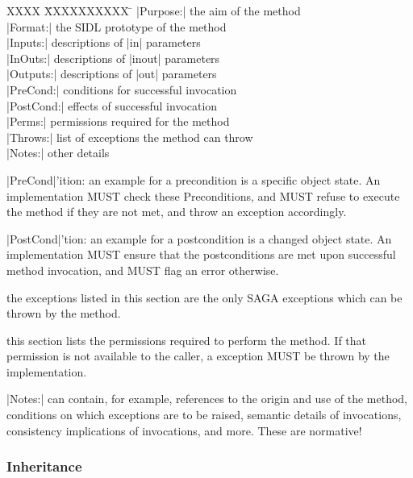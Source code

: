     \begin{tabbing}
     XXXX \= XXXXXXXXXX    \= \kill
          \> |Purpose:|    \> the aim of the method\\
          \> |Format:|     \> the SIDL prototype of the method\\
          \> |Inputs:|     \> descriptions of |in|    parameters\\
          \> |InOuts:|     \> descriptions of |inout| parameters\\
          \> |Outputs:|    \> descriptions of |out|   parameters\\
          \> |PreCond:|    \> conditions for successful invocation\\
          \> |PostCond:|   \> effects of successful invocation\\
          \> |Perms:|      \> permissions required for the method\\
          \> |Throws:|     \> list of exceptions the method can throw\\
          \> |Notes:|      \> other details
    \end{tabbing}

    |PreCond|'ition: an example for a precondition is a specific
    object state.  An implementation MUST check these
    Preconditions, and MUST refuse to execute the method if they
    are not met, and throw an exception accordingly.

    |PostCond|'tion:  an example for a postcondition is a
    changed object state.  An implementation MUST
    ensure that the postconditions are met upon successful
    method invocation, and MUST flag an error otherwise.

     the exceptions listed in this
    section are the only SAGA exceptions which can be thrown by
    the method.

     this section lists the permissions
    required to perform the method.  If that permission is not
    available to the caller, a  exception
    MUST be thrown by the implementation.

    |Notes:| can contain, for example, references to the origin
    and use of the method, conditions on which exceptions
    are to be raised, semantic details of invocations,
    consistency implications of invocations, and more.
    These  are normative!


 \subsubsection{Inheritance}

